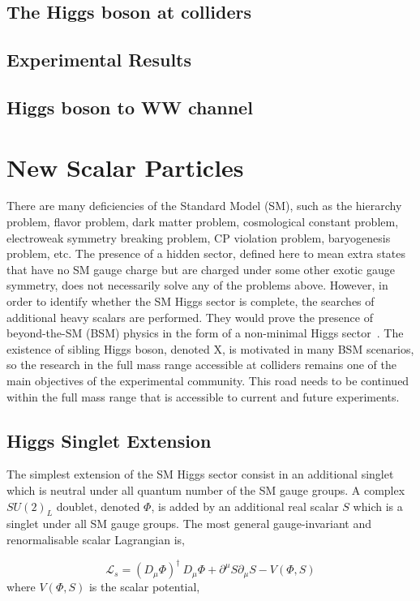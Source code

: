 \subsection*{The Higgs boson at colliders}

\subsection*{Experimental Results}

\subsection*{Higgs boson to WW channel}

\section{New Scalar Particles}
There are many deficiencies of the Standard Model (SM), such as the hierarchy problem,
flavor problem, dark matter problem, cosmological constant problem, electroweak symmetry breaking problem, CP violation problem, baryogenesis problem, etc.
The presence of a hidden sector, defined here to mean extra states that
have no SM gauge charge but are charged under some other exotic gauge symmetry, does not necessarily solve any of the problems above. However, in order to identify whether the SM Higgs sector is complete,  the searches of additional heavy scalars are performed.  They would prove the presence of beyond-the-SM (BSM) physics in the form of a non-minimal Higgs sector~\cite{Robens:2015gla}. The existence of sibling Higgs boson, denoted X, is motivated in many BSM scenarios, so the research in the full mass range accessible at colliders  remains one of the main objectives of the experimental community. This  road  needs  to  be continued within the full mass range that is accessible to current and future experiments.
\newline
\subsection*{Higgs Singlet Extension}
The simplest extension of the SM Higgs sector consist in an additional singlet which is neutral under all quantum number of the SM gauge groups.
A complex $SU(2)_L$ doublet,  denoted $\Phi$, is added by an additional real scalar $S$ which is a singlet under all SM gauge groups. 
The most general gauge-invariant and renormalisable scalar Lagrangian is,


\begin{equation}
 \mathcal{L}_s = (D_{\mu} \Phi )^{\dagger}  \: D_{\mu} \Phi  +  \partial^{\mu}S   \partial_{\mu}S -V(\Phi, S)     \end{equation}
where $V(\Phi, S) $ is the scalar potential,  

